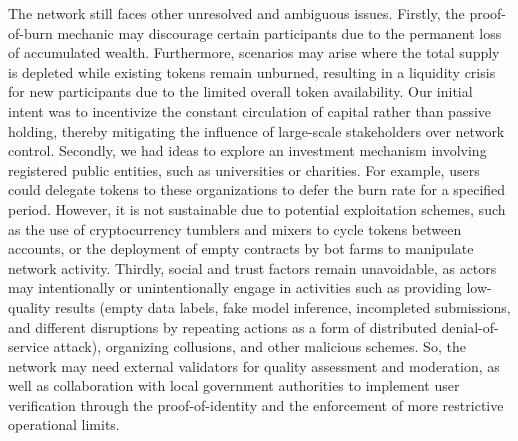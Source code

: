 The network still faces other unresolved and ambiguous issues. Firstly, the proof-of-burn mechanic may discourage certain participants due to the permanent loss of accumulated wealth. Furthermore, scenarios may arise where the total supply is depleted while existing tokens remain unburned, resulting in a liquidity crisis for new participants due to the limited overall token availability. Our initial intent was to incentivize the constant circulation of capital rather than passive holding, thereby mitigating the influence of large-scale stakeholders over network control. Secondly, we had ideas to explore an investment mechanism involving registered public entities, such as universities or charities. For example, users could delegate tokens to these organizations to defer the burn rate for a specified period. However, it is not sustainable due to potential exploitation schemes, such as the use of cryptocurrency tumblers and mixers to cycle tokens between accounts, or the deployment of empty contracts by bot farms to manipulate network activity. Thirdly, social and trust factors remain unavoidable, as actors may intentionally or unintentionally engage in activities such as providing low-quality results (empty data labels, fake model inference, incompleted submissions, and different disruptions by repeating actions as a form of distributed denial-of-service attack), organizing collusions, and other malicious schemes. So, the network may need external validators for quality assessment and moderation, as well as collaboration with local government authorities to implement user verification through the proof-of-identity and the enforcement of more restrictive operational limits.
